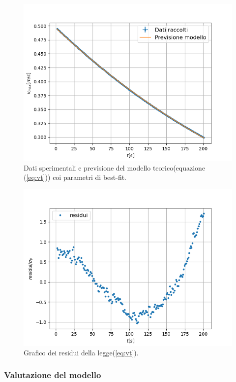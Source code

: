 \documentclass{article}
\begin{document}
\begin{figure}[h!]
	\includegraphics[width=\textwidth]{plot_exp.png}
	\caption{Dati sperimentali e previsione del modello teorico(equazione (\ref{eq:vt})) coi parametri di best-fit.}
	\label{fig:vt}
\end{figure}

\begin{figure}[h!]
	\includegraphics[width=\textwidth]{Residuals_exponential_law.png}
	\caption{Grafico dei residui della legge(\ref{eq:vt}).}
	\label{fig:vtres}
\end{figure}


\subsubsection{Valutazione del modello}
\end{document}
